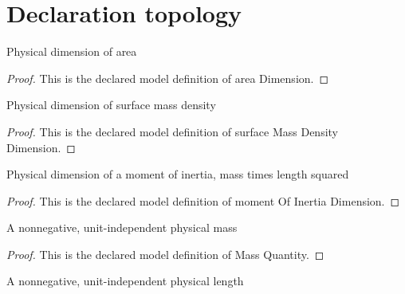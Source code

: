 \section{Declaration topology}
\begin{definition}
  \label{def:physics:phyx-mini-0700:phyxminiproblems-problemphyxmini0700-areadimension}
  Physical dimension of area
\end{definition}
\begin{proof}
  This is the declared model definition of area Dimension.
\end{proof}
\begin{definition}
  \label{def:physics:phyx-mini-0700:phyxminiproblems-problemphyxmini0700-surfacemassdensitydimension}
  Physical dimension of surface mass density
\end{definition}
\begin{proof}
  This is the declared model definition of surface Mass Density Dimension.
\end{proof}
\begin{definition}
  \label{def:physics:phyx-mini-0700:phyxminiproblems-problemphyxmini0700-momentofinertiadimension}
  Physical dimension of a moment of inertia, mass times length squared
\end{definition}
\begin{proof}
  This is the declared model definition of moment Of Inertia Dimension.
\end{proof}
\begin{definition}
  \label{def:physics:phyx-mini-0700:phyxminiproblems-problemphyxmini0700-massquantity}
  A nonnegative, unit-independent physical mass
\end{definition}
\begin{proof}
  This is the declared model definition of Mass Quantity.
\end{proof}
\begin{definition}
  \label{def:physics:phyx-mini-0700:phyxminiproblems-problemphyxmini0700-lengthquantity}
  A nonnegative, unit-independent physical length
\end{definition}
